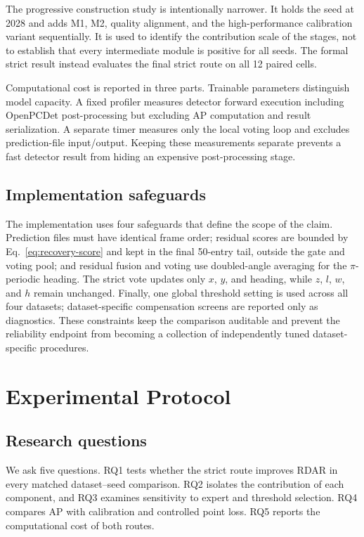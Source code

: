 \documentclass[sensors,article,submit,pdftex,moreauthors]{Definitions/mdpi}
\begin{document}
The progressive construction study is intentionally narrower. It holds the
seed at 2028 and adds M1, M2, quality alignment, and the high-performance
calibration variant sequentially. It is used to identify the contribution
scale of the stages, not to establish that every intermediate module is
positive for all seeds. The formal strict result instead evaluates the final
strict route on all 12 paired cells.

Computational cost is reported in three parts. Trainable parameters distinguish
model capacity. A fixed profiler measures detector forward execution including
OpenPCDet post-processing but excluding AP computation and result
serialization. A separate timer measures only the local voting loop and
excludes prediction-file input/output. Keeping these measurements separate
prevents a fast detector result from hiding an expensive post-processing
stage.

\subsection{Implementation safeguards}

The implementation uses four safeguards that define the scope of the claim.
Prediction files must have identical frame order; residual scores are bounded
by Eq.~\eqref{eq:recovery-score} and kept in the final 50-entry tail, outside
the gate and voting pool; and residual fusion and voting use doubled-angle
averaging for the $\pi$-periodic heading. The strict vote updates only $x$,
$y$, and heading, while $z$, $l$, $w$, and $h$ remain unchanged. Finally, one
global threshold setting is used across all four datasets; dataset-specific
compensation screens are reported only as diagnostics. These constraints keep
the comparison auditable and prevent the reliability endpoint from becoming a
collection of independently tuned dataset-specific procedures.

\section{Experimental Protocol}

\subsection{Research questions}

We ask five questions. RQ1 tests whether the strict route improves RDAR in
every matched dataset--seed comparison. RQ2 isolates the contribution of each
component, and RQ3 examines sensitivity to expert and threshold selection.
RQ4 compares AP with calibration and controlled point loss. RQ5 reports the
computational cost of both routes.
\end{document}

